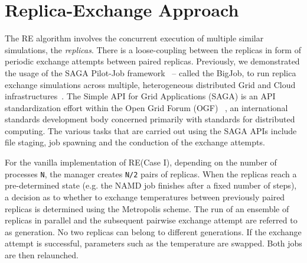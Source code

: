 \documentclass[a4paper,10pt]{article}
\newcommand{\jhanote}[1]{ {\textcolor{red} { ***shantenu: #1 }}}
\newcommand{\alnote}[1]{ {\textcolor{blue} { ***andre: #1 }}}
\newcommand{\athotanote}[1]{ {\textcolor{green} { ***athota: #1 }}}
\newcommand{\alnote}[1]{}
\newcommand{\jhanote}[1]{}
\newcommand{\athotanote}[1]{}
\begin{document}

\section{Replica-Exchange Approach}

The RE algorithm involves the concurrent execution of multiple similar
simulations, the \emph{replicas}.  There is a loose-coupling between
the replicas in form of periodic exchange attempts between paired
replicas. Previously, we demonstrated the usage of the SAGA Pilot-Job
framework~\cite{saga_bigjob_condor_cloud} -- called the BigJob, to run
replica exchange simulations across multiple, heterogeneous
distributed Grid and Cloud infrastructures~\cite{Luckow:2008fp}.
The Simple API for Grid Applications (SAGA) is an
API standardization effort within the Open Grid Forum
(OGF) ~\cite{ogf_web}, an international standards development body
concerned primarily with standards for distributed computing.
The various tasks that are carried out using the SAGA APIs include file staging, job
spawning and the conduction of the exchange attempts.


For the vanilla implementation of RE(Case I), depending
on the number of processes \texttt{N}, the manager creates \texttt{N/2} pairs
of replicas. When the replicas reach a
pre-determined state (e.g. the NAMD job finishes after a fixed number
of steps), a decision as to whether to exchange temperatures between
previously paired replicas is determined using the Metropolis scheme.
The run of an ensemble of replicas in parallel and the subsequent
pairwise exchange attempt are referred to as generation. No two
replicas can belong to different generations. If the exchange attempt
is successful, parameters such as the temperature are swapped. Both
jobs are then relaunched. %
 
\end{document}
